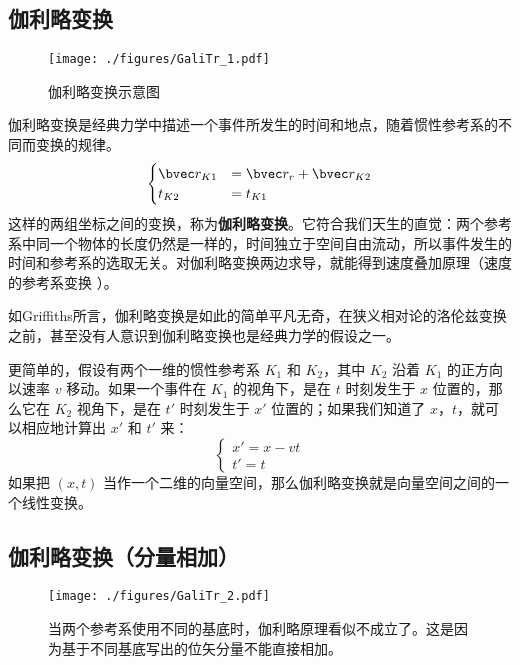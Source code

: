 

\subsection{伽利略变换}
\begin{figure}[ht]
\centering
\texttt{[image: ./figures/GaliTr\_1.pdf]}
\caption{伽利略变换示意图} \label{GaliTr_fig1}
\end{figure}

伽利略变换是经典力学中描述一个事件所发生的时间和地点，随着惯性参考系的不同而变换的规律。
\begin{equation}
\begin{cases}
\bvec r_{K1} &= \bvec r_{r}+\bvec r_{K2}\\
t_{K2}&=t_{K1}
\end{cases}
\end{equation}
这样的两组坐标之间的变换，称为\textbf{伽利略变换}。它符合我们天生的直觉：两个参考系中同一个物体的长度仍然是一样的，时间独立于空间自由流动，所以事件发生的时间和参考系的选取无关。对伽利略变换两边求导，就能得到速度叠加原理（速度的参考系变换 ）。

如Griffiths所言，伽利略变换是如此的简单平凡无奇，在狭义相对论的洛伦兹变换之前，甚至没有人意识到伽利略变换也是经典力学的假设之一。

更简单的，假设有两个一维的惯性参考系 $K_1$ 和 $K_2$，其中 $K_2$ 沿着 $K_1$ 的正方向以速率 $v$ 移动。如果一个事件在 $K_1$ 的视角下，是在 $t$ 时刻发生于 $x$ 位置的，那么它在 $K_2$ 视角下，是在 $t'$ 时刻发生于 $x'$ 位置的；如果我们知道了 $x$，$t$，就可以相应地计算出 $x'$ 和 $t'$ 来：
\begin{equation}
\begin{cases}
x' = x - vt\\
t' = t
\end{cases}
\end{equation}
如果把 $(x, t)$ 当作一个二维的向量空间，那么伽利略变换就是向量空间之间的一个线性变换。

\subsection{伽利略变换（分量相加）}
\begin{figure}[ht]
\centering
\texttt{[image: ./figures/GaliTr\_2.pdf]}
\caption{当两个参考系使用不同的基底时，伽利略原理看似不成立了。这是因为基于不同基底写出的位矢分量不能直接相加。} \label{GaliTr_fig2}
\end{figure}

